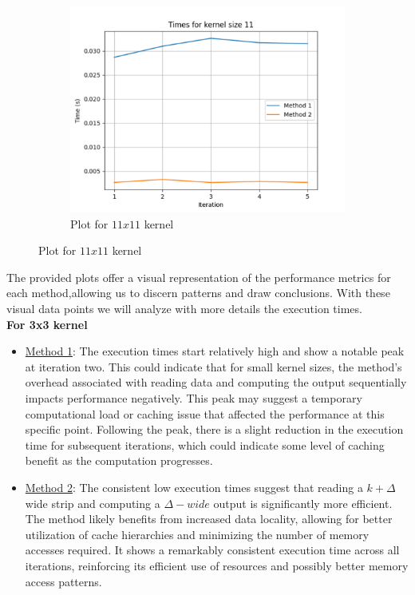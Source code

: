 \begin{figure}[h]
\begin{subfigure}{0.45\linewidth}
		\includegraphics[width=\linewidth]{../Problem 15/figure_kernel11.pdf}
		\caption{Plot for $11x11$ kernel}
		\label{fig:sample_karnel11}
	\end{subfigure}
\end{figure}

The provided plots offer a visual representation of the performance metrics for each method,allowing us to discern patterns and draw conclusions. With these visual data points we will analyze with more details the execution times.\\

\textbf{For 3x3 kernel}
\begin{itemize}
		\item \underline{Method 1}: The execution times start relatively high and show a notable peak at iteration two. This could indicate that for small kernel sizes, the method's overhead associated with reading data and computing the output sequentially impacts performance negatively. This peak may suggest a temporary computational load or caching issue that affected the performance at this specific point. Following the peak, there is a slight reduction in the execution time for subsequent iterations, which could indicate some level of caching benefit as the computation progresses.
		\item \underline{Method 2}: The consistent low execution times suggest that reading a $k+\Delta$ wide strip and computing a $\Delta-wide$ output is significantly more efficient. The method likely benefits from increased data locality, allowing for better utilization of cache hierarchies and minimizing the number of memory accesses required. It shows a remarkably consistent execution time across all iterations, reinforcing its efficient use of resources and possibly better memory access patterns.
\end{itemize}

